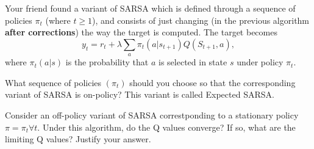 \documentclass[12pt]{exam}
\begin{document}
 
\begin{question}{30}
  Your friend found a variant of SARSA which is defined through a sequence of policies $\pi_t$ (where $t\ge 1$), and consists of just changing (in the previous algorithm {\bf after corrections}) the way the target is computed. The target becomes
  $$
  y_t = r_t + \lambda \sum_a \pi_t(a|s_{t+1})Q(S_{t+1},a),
  $$
  where $\pi_t(a|s)$  is the probability that $a$ is selected in state $s$ under policy $\pi_t.$

  \begin{subquestion}
    What sequence of policies $(\pi_t)$ %
    should you choose so that the corresponding variant of SARSA is on-policy?
    This variant is called Expected SARSA.
  \begin{minipage}[t][1in]{\linewidth}
  \end{minipage}
  \end{subquestion}
  
  \begin{subquestion}
    Consider an off-policy variant of SARSA correstponding to a stationary policy $\pi=\pi_t \forall t.$ Under this algorithm, do the Q values converge? If so, what are the limiting Q values?  Justify your answer.
  \begin{minipage}[t][1in]{\linewidth}
  \end{minipage}
  \end{subquestion}

\end{question}


\end{document}
